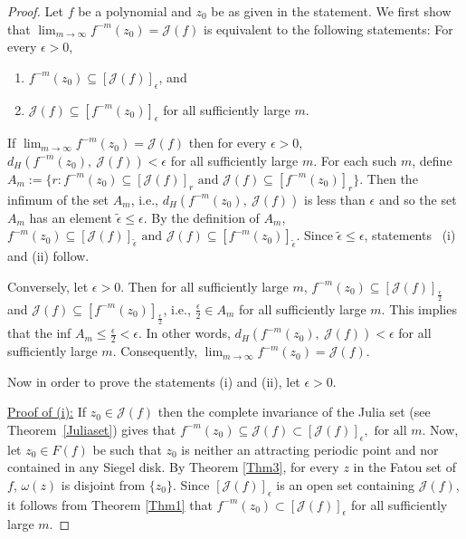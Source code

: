 \documentclass[12pt,a4paper]{article}
\theoremstyle{plain}
\numberwithin{equation}{section}
\begin{document}
 \begin{proof}
Let \(f\) be a polynomial and \(z_0\) be as given in the statement. We first show that  $ \lim_{m\rightarrow \infty}f^{-m}(z_0) = \mathcal{J}(f) $  is equivalent to the following statements: For every $\epsilon>0$,
        \begin{enumerate}[label=(\roman{*})]
            \item \(f^{-m}(z_0) \subseteq [\mathcal{J}(f)]_{\epsilon}\), and
            \item \(\mathcal{J}(f)\subseteq [f^{-m}(z_0)]_{\epsilon}\) for all sufficiently large \(m\).
        \end{enumerate}
        
       If \(\lim_{m\rightarrow \infty}f^{-m}(z_0) = \mathcal{J}(f)\) then for every \(\epsilon >0\),  \(d_H(f^{-m}(z_0),~\mathcal{J}(f)) < \epsilon\) for all sufficiently large $m$. For each such $m$, define \(A_m := \{r: f^{-m}(z_0)\subseteq [\mathcal{J}(f)]_r \text{ and } \mathcal{J}(f) \subseteq [f^{-m}(z_0)]_r\}\).  Then the infimum of the set \(A_m\), i.e., $d_H(f^{-m}(z_0),~\mathcal{J}(f)) $ is less than $\epsilon$ and so the set \(A_m\) has an element \(\tilde{\epsilon} \leq \epsilon\). By the definition of \(A_m\), \(f^{-m}(z_0)\subseteq [\mathcal{J}(f)]_{\tilde{\epsilon}} \text{ and } \mathcal{J}(f) \subseteq [f^{-m}(z_0)]_{\tilde{\epsilon}}\). Since \(\tilde{\epsilon} \leq \epsilon\), statements \ (i)  and  (ii)  follow.
        \par
        Conversely, let $\epsilon >0$. Then for  all sufficiently large $m$, \(f^{-m}(z_0) \subseteq [\mathcal{J}(f)]_{\frac{\epsilon}{2}}\) and \(\mathcal{J}(f)\subseteq [f^{-m}(z_0)]_{\frac{\epsilon}{2}}\),  i.e., $\frac{\epsilon}{2}\in A_m$  for all sufficiently large $m$. This implies that the inf $A_m \leq \frac{\epsilon}{2} < \epsilon$. In other words, $d_H(f^{-m}(z_0),~\mathcal{J}(f)) < \epsilon$   for all sufficiently large $m$. Consequently, $\lim_{m\rightarrow \infty}f^{-m}(z_0) = \mathcal{J}(f)$.
        
        Now in order to prove the statements  (i)  and  (ii), let $\epsilon >0$.
        
\underline{Proof of (i):} If \(z_0 \in \mathcal{J}(f)\) then the complete invariance of  the Julia set (see Theorem~\ref{Juliaset}) gives that
        $f^{-m}(z_0) \subseteq \mathcal{J}(f) \subset [\mathcal{J}(f)]_{\epsilon}, \text{ for all } m$.  Now, let \(z_0 \in F(f)\) be such that \(z_0\) is neither an attracting periodic point and nor contained in any Siegel disk. By Theorem \ref{Thm3}, for every $z$ in the Fatou set of $f$, \(\omega(z)\) is disjoint from $\{z_0\}$.  Since  \([\mathcal{J}(f)]_{\epsilon}\) is an open set containing \(\mathcal{J}(f)\), it follows from Theorem \ref{Thm1} that 
        \(f^{-m}(z_0) \subset [\mathcal{J}(f)]_\epsilon\) for all sufficiently large \(m\).


\end{proof}
\end{document}
